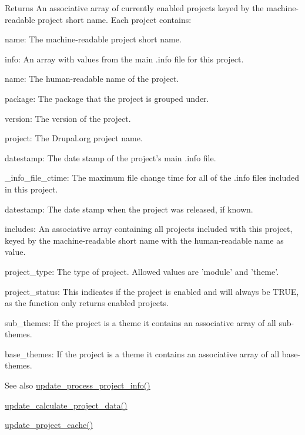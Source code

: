 \begin{DoxyReturn}{Returns}
An associative array of currently enabled projects keyed by the machine-\/readable project short name. Each project contains:
\begin{DoxyItemize}
\item name: The machine-\/readable project short name.
\item info: An array with values from the main .info file for this project.
\begin{DoxyItemize}
\item name: The human-\/readable name of the project.
\item package: The package that the project is grouped under.
\item version: The version of the project.
\item project: The Drupal.org project name.
\item datestamp: The date stamp of the project's main .info file.
\item \_\-info\_\-file\_\-ctime: The maximum file change time for all of the .info files included in this project.
\end{DoxyItemize}
\item datestamp: The date stamp when the project was released, if known.
\item includes: An associative array containing all projects included with this project, keyed by the machine-\/readable short name with the human-\/readable name as value.
\item project\_\-type: The type of project. Allowed values are 'module' and 'theme'.
\item project\_\-status: This indicates if the project is enabled and will always be TRUE, as the function only returns enabled projects.
\item sub\_\-themes: If the project is a theme it contains an associative array of all sub-\/themes.
\item base\_\-themes: If the project is a theme it contains an associative array of all base-\/themes.
\end{DoxyItemize}
\end{DoxyReturn}
\begin{DoxySeeAlso}{See also}
\hyperlink{update_8compare_8inc_ad14173209d3e9cf76fbd6d6d1977de05}{update\_\-process\_\-project\_\-info()} 

\hyperlink{update_8compare_8inc_aa0663304dc4634e4109c896f214ea791}{update\_\-calculate\_\-project\_\-data()} 

\hyperlink{update_8compare_8inc_a958705ecce49b020722280decff3f644}{update\_\-project\_\-cache()} 
\end{DoxySeeAlso}
